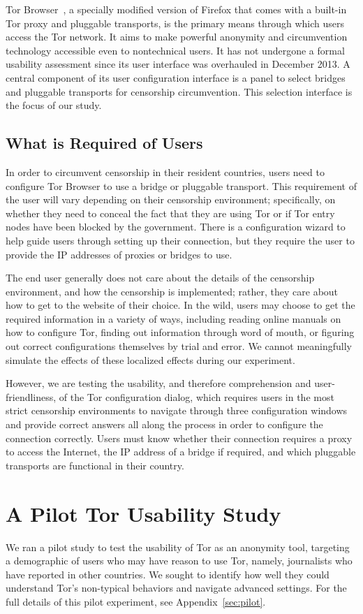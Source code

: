 \documentclass[letterpaper,twocolumn,11pt]{article}
\begin{document}
Tor Browser~\cite{tor-browser},
a specially modified version of Firefox that comes
with a built-in Tor proxy and pluggable transports,
is the primary means through which users access the Tor network.
It aims to make powerful anonymity and circumvention technology
accessible even to nontechnical users.
It has not undergone a formal usability assessment since
its user interface was overhauled in December 2013.
A central component of its user configuration interface
is a panel to select bridges and pluggable transports
for censorship circumvention.
This selection interface is the focus of our study.

\subsection{What is Required of Users}
\indent \indent In order to circumvent censorship in their resident countries, users need to 
configure Tor Browser to use a bridge or pluggable transport. This requirement of the user will vary depending on their censorship
environment; specifically, on whether they need to conceal the fact that they are using Tor or if Tor entry nodes 
have been blocked by the government. There is a configuration wizard to help guide users through setting up their connection, but they require the user to provide the IP addresses of proxies or bridges to use.

The end user generally does not care about the details of the 
censorship environment, and how the censorship is implemented; rather, they care about how to get
to the website of their choice. In the wild, users may choose to get the required information in a variety 
of ways, including reading online manuals on how to configure Tor, finding out information through word of mouth, 
or figuring out correct configurations themselves by trial and error.  We cannot meaningfully simulate the effects
of these localized effects during our experiment.

However, we are testing the usability, and therefore comprehension and user-friendliness, of the Tor configuration 
dialog, which requires users in the most strict censorship environments to navigate through three configuration windows and provide correct answers all along the process in order to configure the connection correctly. Users must know
whether their connection requires a proxy to access the Internet, the IP address of a bridge if required, 
and which pluggable transports are functional in their country. 

\section{A Pilot Tor Usability Study} 
\indent \indent We ran a pilot study to test the usability of Tor as an anonymity tool,
targeting a demographic of users who may have reason to use Tor, namely, journalists who have reported in other
countries. We sought to identify how well they could understand Tor's non-typical behaviors and 
navigate advanced settings. For the full details of this pilot experiment, see Appendix~\ref{sec:pilot}.  
\end{document}
